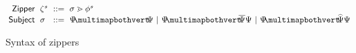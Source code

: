 \begin{figure}
  \vspace{-3px}
  \[
  \arraycolsep=3pt\begin{array}{rlrl}
      \mathsf{Zipper} & \zip^s & ::= & \zipper{\subject}{\tfrelem^s} \\
      \mathsf{Subject} & \subject & ::= &
        \pointing{\selection}{\selection} ~\vert~
        \selecting{\selection}{\selection}{\selection} ~\vert~
        \restructuring{\selection}{\selection}{\selection}
  \end{array}\]
  \caption{
    Syntax of zippers 
  }
  \label{fig:zipper-syntax}
\end{figure}
